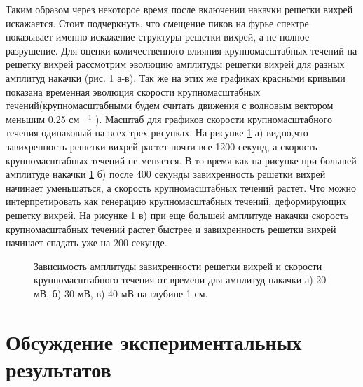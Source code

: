 Таким образом через некоторое время после включении накачки решетки вихрей искажается. Стоит подчеркнуть, что смещение пиков на фурье спектре показывает именно искажение структуры решетки вихрей, а не полное разрушение. Для оценки количественного влияния крупномасштабных течений на решетку вихрей рассмотрим эволюцию амплитуды решетки вихрей для разных амплитуд накачки (рис. \ref{img:underLong} а-в). Так же на этих же графиках красными кривыми показана временная эволюция скорости крупномасштабных течений(крупномасштабными будем считать движения с волновым вектором меньшим 0.25 см $^{-1}$ ). Масштаб для графиков скорости крупномасштабного течения одинаковый на всех трех рисунках. На рисунке \ref{img:underLong} а) видно,что завихренность решетки вихрей растет почти все 1200 секунд, а скорость крупномасштабных течений не меняется. В то время как на рисунке при большей амплитуде накачки \ref{img:underLong} б) после 400 секунды завихренность решетки вихрей начинает уменьшаться, а скорость крупномасштабных течений растет. Что можно интерпретировать как генерацию крупномасштабных течений, деформирующих решетку вихрей. На рисунке \ref{img:underLong} в) при еще большей амплитуде накачки скорость крупномасштабных течений растет быстрее и завихренность решетки вихрей начинает спадать уже на 200 секунде.

\begin{figure}[ht]
  \begin{minipage}[ht]{0.326\linewidth}
  \end{minipage}
  \begin{minipage}[ht]{0.326\linewidth}
  \end{minipage}
  \begin{minipage}[ht]{0.326\linewidth}
  \end{minipage}
    \caption{Зависимость амплитуды завихренности решетки вихрей и скорости крупномасштабного течения от времени для амплитуд накачки а) 20 мВ, б) 30 мВ, в) 40 мВ на глубине 1 см.}
  \label{img:underLong}  
\end{figure}
\clearpage
\section{Обсуждение экспериментальных результатов} \label{sect6_4}

